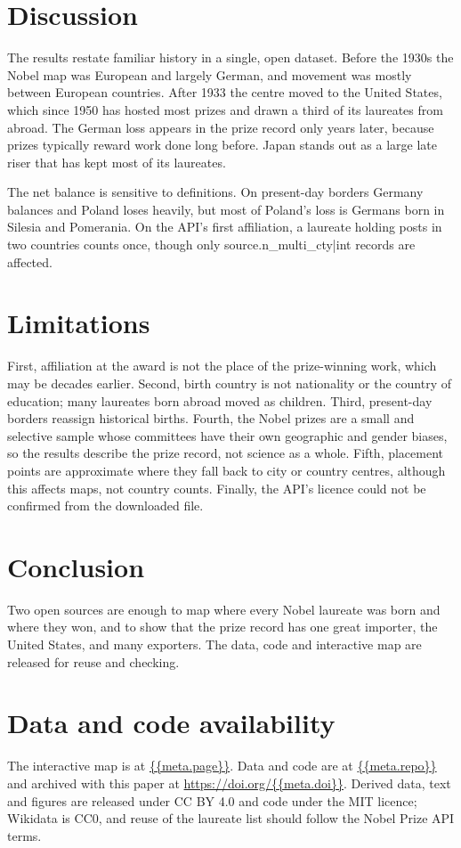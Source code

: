 \documentclass[11pt,a4paper]{article}
\begin{document}
\section{Discussion}
The results restate familiar history in a single, open dataset. Before the 1930s the Nobel map was European and largely German, and movement was mostly between European countries. After 1933 the centre moved to the United States, which since 1950 has hosted most prizes and drawn a third of its laureates from abroad. The German loss appears in the prize record only years later, because prizes typically reward work done long before. Japan stands out as a large late riser that has kept most of its laureates.

The net balance is sensitive to definitions. On present-day borders Germany balances and Poland loses heavily, but most of Poland's loss is Germans born in Silesia and Pomerania. On the API's first affiliation, a laureate holding posts in two countries counts once, though only {{source.n_multi_cty|int}} records are affected.

\section{Limitations}
First, affiliation at the award is not the place of the prize-winning work, which may be decades earlier. Second, birth country is not nationality or the country of education; many laureates born abroad moved as children. Third, present-day borders reassign historical births. Fourth, the Nobel prizes are a small and selective sample whose committees have their own geographic and gender biases, so the results describe the prize record, not science as a whole. Fifth, placement points are approximate where they fall back to city or country centres, although this affects maps, not country counts. Finally, the API's licence could not be confirmed from the downloaded file.

\section{Conclusion}
Two open sources are enough to map where every Nobel laureate was born and where they won, and to show that the prize record has one great importer, the United States, and many exporters. The data, code and interactive map are released for reuse and checking.

\section*{Data and code availability}
The interactive map is at \url{{{meta.page}}}. Data and code are at \url{{{meta.repo}}} and archived with this paper at \url{https://doi.org/{{meta.doi}}}. Derived data, text and figures are released under CC BY 4.0 and code under the MIT licence; Wikidata is CC0, and reuse of the laureate list should follow the Nobel Prize API terms.
\end{document}
